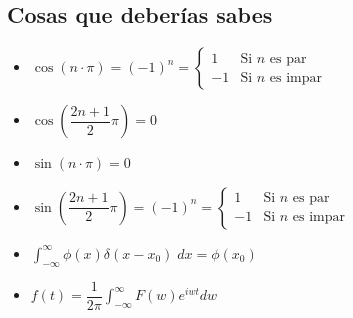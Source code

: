 \documentclass[12pt, fleqn]{report}                             %
\theoremstyle{break}                                            %
\newcommand{\Wrap}[1]           {\left( #1 \right)}             %
\newcommand{\Cos}[1] {\cos\Wrap{#1}}                            %
\newcommand{\Sin}[1] {\sin\Wrap{#1}}                            %
\begin{document}
            \clearpage
            \subsection*{Cosas que deberías sabes}
                \begin{itemize}
                    \item
                        $
                            \Cos{n \cdot \pi} 
                            =
                            (-1)^n  
                            =
                            \begin{cases}
                                1 & \text{Si $n$ es par}      \\
                                -1 & \text{Si $n$ es impar}
                            \end{cases} 
                        $                        

                    \item $\Cos{\dfrac{2n+1}{2} \pi } = 0$

                    \item $\Sin{n \cdot \pi} = 0$

                    \item
                        $
                            \Sin{\dfrac{2n+1}{2} \pi }
                            =
                            (-1)^n  
                            =
                            \begin{cases}
                                1 & \text{Si $n$ es par}      \\
                                -1 & \text{Si $n$ es impar}
                            \end{cases}
                        $
                    \item $\displaystyle \int_{-\infty}^\infty \phi(x) \delta(x-x_0) \; dx = \phi(x_0)$
                    \item $f(t) = \dfrac{1}{2\pi} \int_{-\infty}^\infty F(w) e^{iw t} dw$
                \end{itemize}










\end{document}
